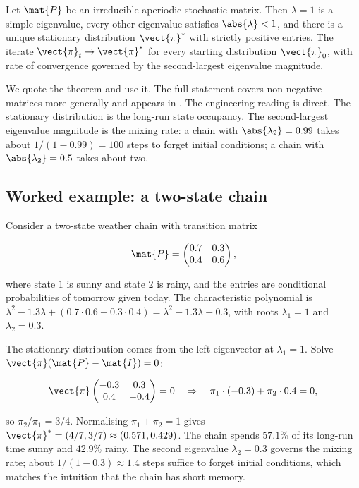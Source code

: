 \begin{theorem}
Let $\mat{P}$ be an irreducible aperiodic stochastic matrix. Then
$\lambda = 1$ is a simple eigenvalue, every other eigenvalue
satisfies $\abs{\lambda} < 1$, and there is a unique stationary
distribution $\vect{\pi}^{*}$ with strictly positive entries. The
iterate $\vect{\pi}_{t} \to \vect{\pi}^{*}$ for every starting
distribution $\vect{\pi}_{0}$, with rate of convergence governed by
the second-largest eigenvalue magnitude.
\end{theorem}

We quote the theorem and use it. The full statement covers
non-negative matrices more generally and appears in
\cite[ch.~8]{text:strang2016}. The engineering reading is direct.
The stationary distribution is the long-run state occupancy. The
second-largest eigenvalue magnitude is the mixing rate: a chain
with $\abs{\lambda_{2}} = 0.99$ takes about $1/(1 - 0.99) = 100$
steps to forget initial conditions; a chain with $\abs{\lambda_{2}} =
0.5$ takes about two.

\subsection{Worked example: a two-state chain}

Consider a two-state weather chain with transition matrix

\[
\mat{P} = \begin{pmatrix} 0.7 & 0.3 \\ 0.4 & 0.6 \end{pmatrix},
\]

where state $1$ is sunny and state $2$ is rainy, and the entries
are conditional probabilities of tomorrow given today. The
characteristic polynomial is $\lambda^{2} - 1.3 \lambda + (0.7
\cdot 0.6 - 0.3 \cdot 0.4) = \lambda^{2} - 1.3 \lambda + 0.3$, with
roots $\lambda_{1} = 1$ and $\lambda_{2} = 0.3$.

The stationary distribution comes from the left eigenvector at
$\lambda_{1} = 1$. Solve $\vect{\pi} (\mat{P} - \mat{I}) = 0$:

\[
\vect{\pi} \begin{pmatrix} -0.3 & 0.3 \\ 0.4 & -0.4 \end{pmatrix}
= 0
\quad \Rightarrow \quad
\pi_{1} \cdot (-0.3) + \pi_{2} \cdot 0.4 = 0,
\]

so $\pi_{2}/\pi_{1} = 3/4$. Normalising $\pi_{1} + \pi_{2} = 1$
gives $\vect{\pi}^{*} = (4/7, 3/7) \approx (0.571, 0.429)$. The
chain spends $57.1\%$ of its long-run time sunny and $42.9\%$ rainy.
The second eigenvalue $\lambda_{2} = 0.3$ governs the mixing rate;
about $1/(1 - 0.3) \approx 1.4$ steps suffice to forget initial
conditions, which matches the intuition that the chain has short
memory.

